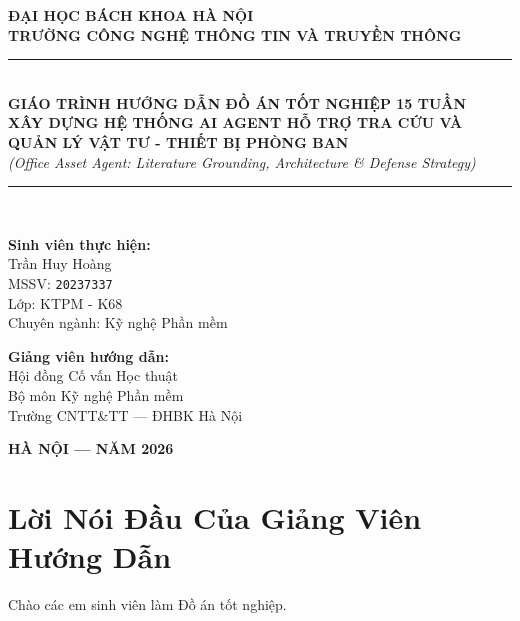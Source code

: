 \documentclass[11pt,a4paper]{article}
\begin{document}
\begin{titlepage}
    \centering
    \vspace*{0.5cm}
    {\large\bfseries ĐẠI HỌC BÁCH KHOA HÀ NỘI}\\[0.3cm]
    {\large\bfseries TRƯỜNG CÔNG NGHỆ THÔNG TIN VÀ TRUYỀN THÔNG}\\[1.5cm]
    
    \rule{\textwidth}{1.5pt}\\[0.5cm]
    {\huge\bfseries GIÁO TRÌNH HƯỚNG DẪN ĐỒ ÁN TỐT NGHIỆP 15 TUẦN}\\[0.4cm]
    {\Large\bfseries XÂY DỰNG HỆ THỐNG AI AGENT HỖ TRỢ TRA CỨU VÀ QUẢN LÝ VẬT TƯ - THIẾT BỊ PHÒNG BAN}\\[0.2cm]
    {\large\itshape (Office Asset Agent: Literature Grounding, Architecture \& Defense Strategy)}\\
    \rule{\textwidth}{1.5pt}\\[1.5cm]

    \begin{minipage}{0.48\textwidth}
        \large
        \textbf{Sinh viên thực hiện:}\\
        Trần Huy Hoàng\\
        MSSV: \texttt{20237337}\\
        Lớp: KTPM - K68\\
        Chuyên ngành: Kỹ nghệ Phần mềm
    \end{minipage}
    \hfill
    \begin{minipage}{0.48\textwidth}
        \large
        \raggedleft
        \textbf{Giảng viên hướng dẫn:}\\
        Hội đồng Cố vấn Học thuật\\
        Bộ môn Kỹ nghệ Phần mềm\\
        Trường CNTT\&TT — ĐHBK Hà Nội
    \end{minipage}

    \vfill
    {\large\bfseries HÀ NỘI — NĂM 2026}
\end{titlepage}

\newpage
{}

\section*{Lời Nói Đầu Của Giảng Viên Hướng Dẫn}

Chào các em sinh viên làm Đồ án tốt nghiệp.
\end{document}
